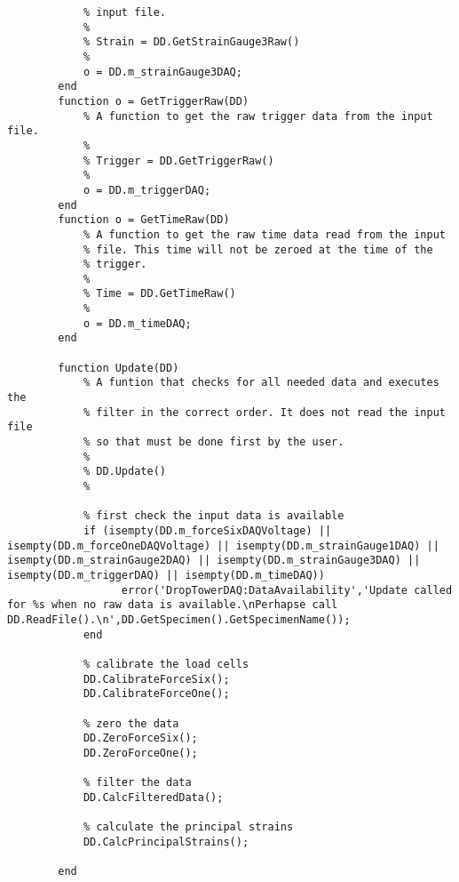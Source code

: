 \begin{lstlisting}
            % input file.
            %
            % Strain = DD.GetStrainGauge3Raw()
            %
            o = DD.m_strainGauge3DAQ;
        end
        function o = GetTriggerRaw(DD)
            % A function to get the raw trigger data from the input file.
            %
            % Trigger = DD.GetTriggerRaw()
            %
            o = DD.m_triggerDAQ;
        end
        function o = GetTimeRaw(DD)
            % A function to get the raw time data read from the input
            % file. This time will not be zeroed at the time of the
            % trigger.
            %
            % Time = DD.GetTimeRaw()
            %
            o = DD.m_timeDAQ;
        end
        
        function Update(DD)
            % A funtion that checks for all needed data and executes the
            % filter in the correct order. It does not read the input file
            % so that must be done first by the user.
            %
            % DD.Update()
            %
            
            % first check the input data is available
            if (isempty(DD.m_forceSixDAQVoltage) || isempty(DD.m_forceOneDAQVoltage) || isempty(DD.m_strainGauge1DAQ) || isempty(DD.m_strainGauge2DAQ) || isempty(DD.m_strainGauge3DAQ) || isempty(DD.m_triggerDAQ) || isempty(DD.m_timeDAQ))
                  error('DropTowerDAQ:DataAvailability','Update called for %s when no raw data is available.\nPerhapse call DD.ReadFile().\n',DD.GetSpecimen().GetSpecimenName());
            end
            
            % calibrate the load cells
            DD.CalibrateForceSix();
            DD.CalibrateForceOne();
            
            % zero the data
            DD.ZeroForceSix();
            DD.ZeroForceOne();
            
            % filter the data
            DD.CalcFilteredData();
            
            % calculate the principal strains
            DD.CalcPrincipalStrains();
            
        end
        

\end{lstlisting}
